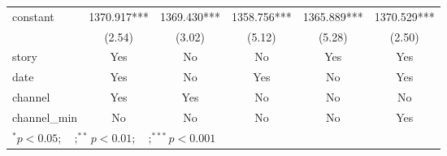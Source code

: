 \begin{tabular}{l*{5}{c}}
constant            &    1370.917***&    1369.430***&    1358.756***&    1365.889***&    1370.529***\\
                    &      (2.54)   &      (3.02)   &      (5.12)   &      (5.28)   &      (2.50)   \\
\midrule
story               &         Yes   &          No   &          No   &         Yes   &         Yes   \\
date                &         Yes   &          No   &         Yes   &          No   &         Yes   \\
channel             &         Yes   &         Yes   &          No   &          No   &          No   \\
channel\_min         &          No   &          No   &          No   &          No   &         Yes   \\
\bottomrule
\multicolumn{6}{l}{\footnotesize $^{*}p<0.05; \quad ; ^{**} p<0.01; \quad ; ^{***}p<0.001$}\\
\end{tabular}
